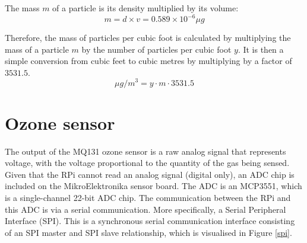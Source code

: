\documentclass[11pt,twosided,a4paper]{report}
\begin{document}
The mass $m$ of a particle is its density multiplied by its volume:
\begin{equation}
m = d \times v = 0.589 \times 10^{-6} \mu g
\end{equation}

Therefore, the mass of particles per cubic foot is calculated by multiplying the mass of a particle $m$ by the number of particles per cubic foot $y$. It is then a simple conversion from cubic feet to cubic metres by multiplying by a factor of $3531.5$.
\begin{equation}
\mu g/m^3 = y \cdot m \cdot 3531.5
\end{equation}

%
%
%

\section{Ozone sensor} \label{mq131_calibration}

The output of the MQ131 ozone sensor is a raw analog signal that represents voltage, with the voltage proportional to the quantity of the gas being sensed. Given that the RPi cannot read an analog signal (digital only), an ADC chip is included on the MikroElektronika sensor board. The ADC is an MCP3551, which is a single-channel 22-bit ADC chip. The communication between the RPi and this ADC is via a serial communication. More specifically, a Serial Peripheral Interface (SPI). This is a synchronous serial communication interface consisting of an SPI master and SPI slave relationship, which is visualised in Figure \ref{spi}.
\end{document}

